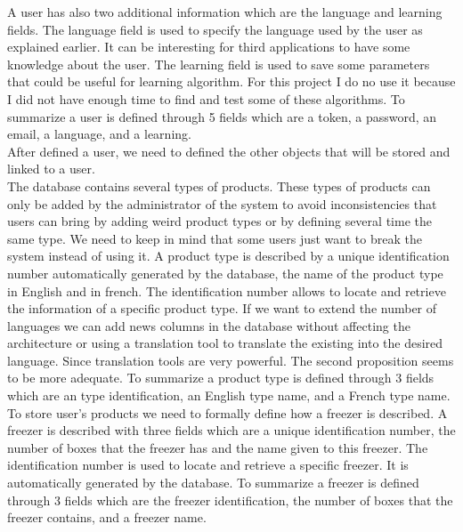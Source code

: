 A user has also two additional information which are the language and learning fields. The language field is used to specify the language used by the user as explained earlier. It can be interesting for third applications to have some knowledge about the user. The learning field is used to save some parameters that could be useful for learning algorithm. For this project I do no use it because I did not have enough time to find and test some of these algorithms. To summarize a user is defined through 5 fields which are a token, a password, an email, a language, and a learning.\\

After defined a user, we need to defined the other objects that will be stored and linked to a user.\\

The database contains several types of products. These types of products can only be added by the administrator of the system to avoid inconsistencies that users can bring by adding weird product types or by defining several time the same type. We need to keep in mind that some users just want to break the system instead of using it. A product type is described by a unique identification number automatically generated by the database, the name of the product type in English and in french. The identification number allows to locate and retrieve the information of a specific product type. If we want to extend the number of languages we can add news columns in the database without affecting the architecture or using a translation tool to translate the existing into the desired language. Since translation tools are very powerful. The second proposition seems to be more adequate. To summarize a product type is defined through 3 fields which are an type identification, an English type name, and a French type name.\\

To store user's products we need to formally define how a freezer is described. A freezer is described with three fields which are a unique identification number, the number of boxes that the freezer has and the name given to this freezer. The identification number is used to locate and retrieve a specific freezer. It is automatically generated by the database. To summarize a freezer is defined through 3 fields which are the freezer identification, the number of boxes that the freezer contains, and a freezer name.\\

